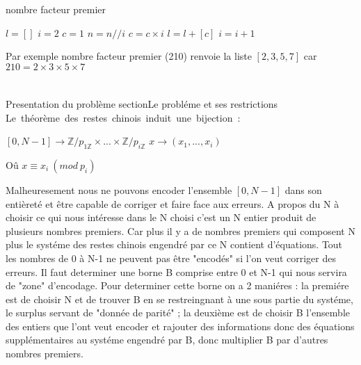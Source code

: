 \documentclass[a4paper, 11pt]{report}
\begin{document}
\begin{algorithm}
    \caption{nombre facteur premier}
    \begin{algorithmic}
        \STATE $l=[]$
        \STATE $i=2$
        \STATE $c=1$
        \STATE $n=n//i$
        \STATE $c=c\times i$
        \ENDWHILE
        \STATE $l=l+\left[c\right] $
        \ENDIF
        \STATE $i=i+1$
        \ENDWHILE
    \end{algorithmic}
\end{algorithm}

Par exemple nombre facteur premier (210) renvoie la liste $[2,3,5,7]$ car $210=2\times 3\times 5\times 7$

\newpage
\chapter{}{Presentation du problème}
section{Le probléme et ses restrictions}
\hbox{Le théorème des restes chinois induit une bijection :}
\begin{center}
  

$[0,N-1] \rightarrow \mathbb{Z}/ p_{1 \mathbb{Z}} \times  ... \times   \mathbb{Z}/ p_{i \mathbb{Z}} $  \newline
$x \rightarrow (x_1,...,x_i) $ 

\end{center}

Oû $ x\equiv x_i \: (mod \: p_i)$
\newline

Malheuresement nous ne pouvons encoder l'ensemble $[0,N-1]$ dans son entièreté et être capable de corriger et faire face aux erreurs.\newline
A  propos du N à choisir ce qui nous intéresse dans le N choisi c'est un N entier produit de plusieurs nombres premiers.\newline 
Car plus il y a de nombres premiers qui composent N plus le systéme des restes chinois engendré par ce N contient d'équations.  \newline
Tout les nombres de 0 à N-1 ne peuvent pas être "encodés" si l'on veut corriger des erreurs.\newline
Il faut determiner une borne B comprise entre 0 et N-1 qui nous servira de "zone" d'encodage.\newline
Pour determiner cette borne on a 2 maniéres :\newline
la premiére est de choisir N et de trouver B en se restreingnant à une sous partie du systéme, le surplus servant de "donnée de parité" ;\newline
la deuxième est de choisir B l'ensemble des entiers que l'ont veut encoder et rajouter des informations donc des équations supplémentaires au systéme engendré par B, donc multiplier B par d'autres nombres premiers.\newline
\end{document}
